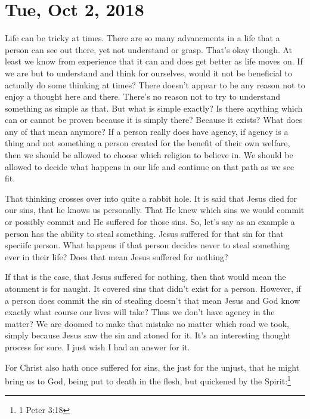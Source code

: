 \section{Tue, Oct 2, 2018}

Life can be tricky at times. There are so many advancments in a life that a person can
see out there, yet not understand or grasp. That's okay though. At least we know from
experience that it can and does get better as life moves on. If we are but to
understand and think for ourselves, would it not be beneficial to actually do some
thinking at times? There doesn't appear to be any reason not to enjoy a thought here
and there. There's no reason not to try to understand something as simple as that.
But what is simple exactly? Is there anything which can or cannot be proven because
it is simply there? Because it exists? What does any of that mean anymore? If a
person really does have agency, if agency is a thing and not something a person
created for the benefit of their own welfare, then we should be allowed to choose
which religion to believe in. We should be allowed to decide what happens in our life
and continue on that path as we see fit.

That thinking crosses over into quite a rabbit hole. It is said that Jesus died for
our sins, that he knows us personally. That He knew which sins we would commit or
possibly commit and He suffered for those sins. So, let's say as an example a person
has the ability to steal something. Jesus suffered for that sin for that speciifc
person. What happens if that person decides never to steal something ever in their
life? Does that mean Jesus suffered for nothing?

If that is the case, that Jesus suffered for nothing, then that would mean the
atonment is for naught. It covered sins that didn't exist for a person. However, if a
person does commit the sin of stealing doesn't that mean Jesus and God know exactly
what course our lives will take? Thus we don't have agency in the matter? We are
doomed to make that mistake no matter which road we took, simply because Jesus saw
the sin and atoned for it. It's an interesting thought process for sure. I just wish
I had an answer for it.

\begin{displayquote}
For Christ also hath once suffered for sins, the just for the unjust, that he might 
bring us to God, being put to death in the flesh, but quickened by the
Spirit:\footnote{1 Peter 3:18}
\end{displayquote}

